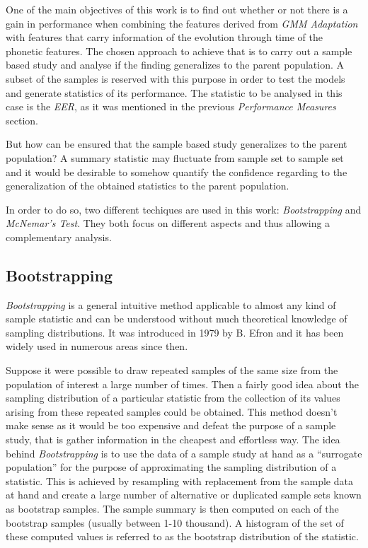 One of the main objectives of this work is to find out whether or not there is a gain in performance
when combining the features derived from \textit{GMM Adaptation} with features
that carry information of the evolution through time of the phonetic features.
The chosen approach to achieve that is to carry out a sample based study and analyse if the
finding generalizes to the parent population. A subset of the samples
is reserved with this purpose in order to test the models and generate statistics of its
performance. The statistic to be analysed in this case
is the \textit{EER}, as it was mentioned in the previous \textit{Performance
Measures} section.

But how can be ensured that the sample based study generalizes to the parent population?
A summary statistic may fluctuate from sample set to sample set and it would be
desirable to somehow quantify the confidence regarding to the generalization of the
obtained statistics to the parent population.

In order to do so, two different techiques are used in this work: \textit{Bootstrapping} and \\
\textit{McNemar's Test}. They both focus on different aspects and thus allowing a
complementary analysis.

\subsection{Bootstrapping}

\cite{bootstrapping} \textit{Bootstrapping} is a general intuitive method applicable
to almost any kind of sample statistic and can be understood without much theoretical
knowledge of sampling distributions. It was introduced in 1979 by B. Efron and it has
been widely used in numerous areas since then.

Suppose it were possible to draw repeated samples
of the same size from the population of interest a large number of times. Then
a fairly good idea about the sampling distribution of a particular statistic from
the collection of its values arising from these repeated samples could be obtained.
This method doesn't make sense as it would be too expensive and defeat the purpose of a
sample study, that is gather information in the cheapest and effortless way.
The idea behind \textit{Bootstrapping} is to use the data of a sample study at hand as a
``surrogate population'' for the purpose of approximating the sampling distribution of
a statistic. This is achieved by resampling with replacement from the sample data
at hand and create a large number of alternative or duplicated sample sets known as
bootstrap samples. The sample summary is then computed on each of the bootstrap
samples (usually between 1-10 thousand). A histogram of the set of these computed
values is referred to as the bootstrap distribution of the statistic.

